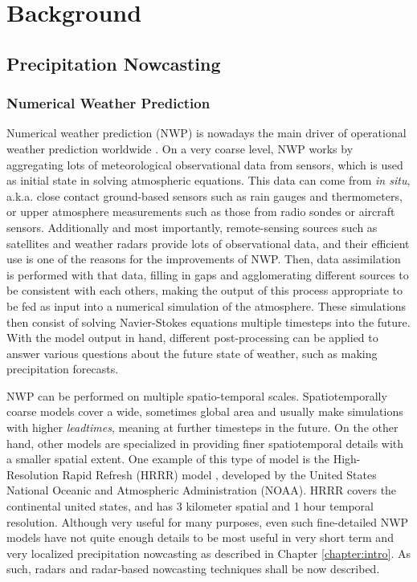 \chapter{Background}
\label{chapter:background} 

\section{Precipitation Nowcasting}

\subsection*{Numerical Weather Prediction}

Numerical weather prediction (NWP) is nowadays the main driver of operational weather prediction worldwide \cite{schultz_can_2021, bauer_quiet_2015}. On a very coarse level, NWP works by aggregating lots of meteorological observational data from sensors, which is used as initial state in solving atmospheric equations. This data can come from \textit{in situ}, a.k.a. close contact ground-based sensors such as rain gauges and thermometers, or upper atmosphere measurements such as those from radio sondes or aircraft sensors. Additionally and most importantly, remote-sensing sources such as satellites and weather radars provide lots of observational data, and their efficient use is one of the reasons for the improvements of NWP. Then, data assimilation is performed with that data, filling in gaps and agglomerating different sources to be consistent with each others, making the output of this process appropriate to be fed as input into a numerical simulation of the atmosphere. These simulations then consist of solving Navier-Stokes equations multiple timesteps into the future. With the model output in hand, different post-processing can be applied to answer various questions about the future state of weather, such as making precipitation forecasts.

NWP can be performed on multiple spatio-temporal scales. Spatiotemporally coarse models cover a wide, sometimes global area and usually make simulations with higher \textit{leadtimes}, meaning at further timesteps in the future. On the other hand, other models are specialized in providing finer spatiotemporal details with a smaller spatial extent. One example of this type of model is the High-Resolution Rapid Refresh (HRRR) model \cite{alexander2020rapid}, developed by the United States National Oceanic and Atmospheric Administration (NOAA). HRRR covers the continental united states, and has 3 kilometer spatial and 1 hour temporal resolution. Although very useful for many purposes, even such fine-detailed NWP models have not quite enough details to be most useful in very short term and very localized precipitation nowcasting as described in Chapter \ref{chapter:intro}. As such, radars and radar-based nowcasting techniques shall be now described.

